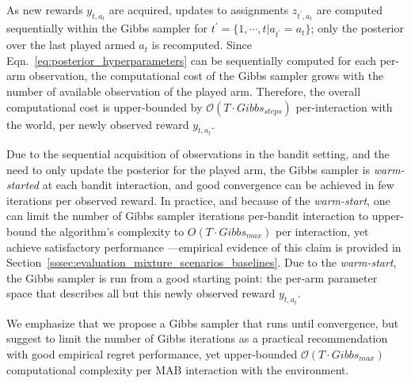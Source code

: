 As new rewards $y_{t,a_{t}}$ are acquired, updates to assignments $z_{t^\prime,a_{t}}$ are computed sequentially within the Gibbs sampler for $t^\prime=\{1,\cdots,t | a_{t^\prime}=a_{t}\}$; \ie only the posterior over the last played armed $a_{t}$ is recomputed. Since Eqn.~\eqref{eq:posterior_hyperparameters} can be sequentially computed for each per-arm observation, the computational cost of the Gibbs sampler grows with the number of available observation of the played arm. Therefore, the overall computational cost is upper-bounded by $\mathcal{O}(T \cdot Gibbs_{steps})$ per-interaction with the world, \ie per newly observed reward $y_{t,a_{t}}$.

Due to the sequential acquisition of observations in the bandit setting, and the need to only update the posterior for the played arm, the Gibbs sampler is \textit{warm-started} at each bandit interaction, and good convergence can be achieved in few iterations per observed reward. 
In practice, and because of the \textit{warm-start}, one can limit the number of Gibbs sampler iterations per-bandit interaction to upper-bound the algorithm's complexity to $O(T\cdot Gibbs_{max})$ per interaction, yet achieve satisfactory performance ---empirical evidence of this claim is provided in Section~\ref{sssec:evaluation_mixture_scenarios_baselines}.
Due to the \textit{warm-start}, the Gibbs sampler is run from a good starting point: the per-arm parameter space that describes all but this newly observed reward $y_{t,a_{t}}$.

We emphasize that we propose a Gibbs sampler that runs until convergence, but suggest to limit the number of Gibbs iterations as a practical recommendation with good empirical regret performance, yet upper-bounded $\mathcal{O}(T \cdot Gibbs_{max})$ computational complexity per MAB interaction with the environment.

